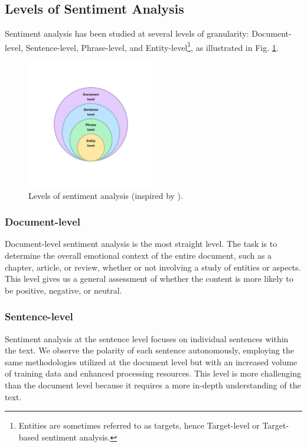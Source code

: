 \subsection{Levels of Sentiment Analysis}
\label{subsec:levels-of-sentiment-analysis}
Sentiment analysis has been studied at several levels of granularity: Document-level, Sentence-level, Phrase-level, and Entity-level\footnote{Entities are sometimes referred to as targets, hence Target-level or Target-based sentiment analysis.}, as illustrated in Fig. \ref{fig:sa-levels}.

\begin{figure}[H]
    \centering
    \includegraphics[width=0.5\textwidth]{img/sa-levels.pdf}
    \caption{Levels of sentiment analysis (inspired by \cite{Wankhade2022}).}
    \label{fig:sa-levels}
\end{figure}

\subsubsection*{Document-level}
\label{subsubsec:document-level}
Document-level sentiment analysis is the most straight level. The task is to determine the overall emotional context of the entire document, such as a chapter, article, or review, whether or not involving a study of entities or aspects. This level gives us a general assessment of whether the content is more likely to be positive, negative, or neutral. 

\subsubsection*{Sentence-level}
\label{subsubsec:sentence-level}
Sentiment analysis at the sentence level focuses on individual sentences within the text. We observe the polarity of each sentence autonomously, employing the same methodologies utilized at the document level but with an increased volume of training data and enhanced processing resources. This level is more challenging than the document level because it requires a more in-depth understanding of the text. 

